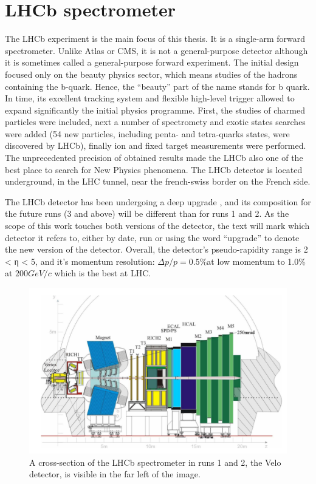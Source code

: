 \section{LHCb spectrometer}

The LHCb\cite{Collaboration_2008} experiment is the main focus of this thesis. It is a single-arm forward spectrometer. Unlike Atlas or CMS, it is not a general-purpose detector although it is sometimes called a general-purpose forward experiment. The initial design focused only on the beauty physics sector, which means studies of the hadrons containing the b-quark. Hence, the ``beauty'' part of the name stands for b quark. In time, its excellent tracking system and flexible high-level trigger allowed to expand significantly the initial physics programme. First, the studies of charmed particles were included, next a number of spectromety and exotic states searches were added (54 new particles, including penta- and tetra-quarks states, were discovered by LHCb), finally ion and fixed target measurements were performed. The unprecedented precision of obtained results made the LHCb also one of the best place to search for New Physics phenomena. 
The LHCb detector is located underground, in the LHC tunnel, near the french-swiss border on the French side.

The LHCb detector has been undergoing a deep upgrade \cite{CERN-LHCC-2011-001, Bediaga:1443882}, and its composition for the future runs (3 and above) will be different than for runs 1 and 2.
As the scope of this work touches both versions of the detector, the text will mark which detector it refers to, either by date, run or using the word ``upgrade'' to denote the new version of the detector.
Overall, the detector's pseudo-rapidity range is 2 < η < 5, and it's momentum resolution: $Δ p / p = 0.5\%$at low momentum to 1.0\% at $200 GeV/c$ \cite{lhcb_performance_numbers} which is the best at LHC.

\begin{figure}
  \centering
  \includegraphics[width=0.9\linewidth]{figures/chapter2/LHCb.png}
  \caption{A cross-section of the LHCb spectrometer in runs 1 and 2, the Velo detector, is visible in the far left of the image.}
  \label{fig:lhcb}
\end{figure}

